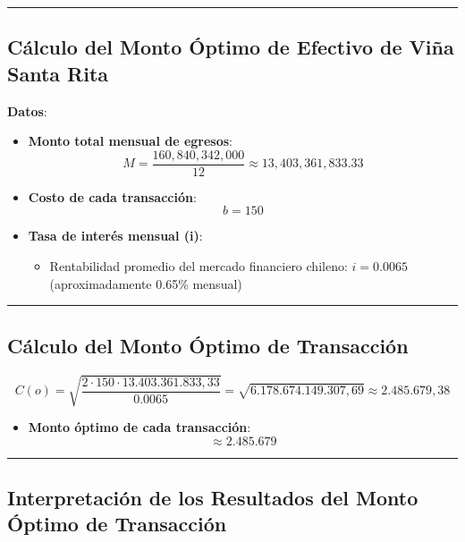 \documentclass[
  letterpaper,
  DIV=11,
  numbers=noendperiod]{scrartcl}
\providecommand{\tightlist}{%
  \setlength{\itemsep}{0pt}\setlength{\parskip}{0pt}}\usepackage{longtable,booktabs,array}
\begin{document}
\begin{center}\rule{0.5\linewidth}{0.5pt}\end{center}

\subsection{Cálculo del Monto Óptimo de Efectivo de Viña Santa
Rita}\label{cuxe1lculo-del-monto-uxf3ptimo-de-efectivo-de-viuxf1a-santa-rita}

\textbf{Datos}:

\begin{itemize}
\item
  \textbf{Monto total mensual de egresos}:\\
  \[
  M = \frac{160,840,342,000}{12} \approx 13,403,361,833.33
  \]
\item
  \textbf{Costo de cada transacción}:\\
  \[
  b = 150
  \]
\item
  \textbf{Tasa de interés mensual (i)}:

  \begin{itemize}
  \tightlist
  \item
    Rentabilidad promedio del mercado financiero chileno: \(i = 0.0065\)
    (aproximadamente 0.65\% mensual)
  \end{itemize}
\end{itemize}

\begin{center}\rule{0.5\linewidth}{0.5pt}\end{center}

\subsection{Cálculo del Monto Óptimo de
Transacción}\label{cuxe1lculo-del-monto-uxf3ptimo-de-transacciuxf3n}

\[
C(o) = \sqrt{\frac{2 \cdot 150 \cdot 13.403.361.833,33}{0.0065}} = \sqrt{6.178.674.149.307,69} \approx 2.485.679,38
\]

\begin{itemize}
\tightlist
\item
  \textbf{Monto óptimo de cada transacción}: \[
  \approx 2.485.679
  \]
\end{itemize}

\begin{center}\rule{0.5\linewidth}{0.5pt}\end{center}

\subsection{Interpretación de los Resultados del Monto Óptimo de
Transacción}\label{interpretaciuxf3n-de-los-resultados-del-monto-uxf3ptimo-de-transacciuxf3n}
\end{document}
